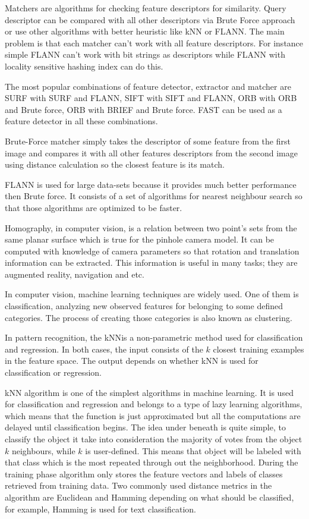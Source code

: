 \documentclass[../../../../main]{subfiles}
\begin{document}
Matchers are algorithms for checking feature descriptors for similarity. Query descriptor can be compared with all other descriptors via Brute Force approach or use other algorithms with better heuristic like \ac{kNN} or \ac{FLANN}. The main problem is that each matcher can't work with all feature descriptors. For instance simple \ac{FLANN} can't work with bit strings as descriptors while \ac{FLANN} with locality sensitive hashing index can do this.

The most popular combinations of feature detector, extractor and matcher are \ac{SURF} with \ac{SURF} and \ac{FLANN}, \ac{SIFT} with \ac{SIFT} and \ac{FLANN}, \ac{ORB} with \ac{ORB} and Brute force, \ac{ORB} with \ac{BRIEF} and Brute force. \ac{FAST} can be used as a feature detector in all these combinations.

Brute-Force matcher simply takes the descriptor of some feature from the first image and compares it with all other features descriptors from the second image using distance calculation so the closest feature is its match.

\ac{FLANN} is used for large data-sets because it provides much better performance then Brute force. It consists of a set of algorithms for nearest neighbour search so that those algorithms are optimized to be faster.

Homography, in computer vision, is a relation between two point's sets from the same planar surface which is true for the pinhole camera model. It can be computed with knowledge of camera parameters so that rotation and translation information can be extracted. This information is useful in many tasks; they are augmented reality, navigation and etc.

In computer vision, machine learning techniques are widely used. One of them is classification, analyzing new observed features for belonging to some defined categories. The process of creating those categories is also known as clustering.

In pattern recognition, the \ac{kNN}is a non-parametric method used for classification and regression. In both cases, the input consists of the $k$ closest training examples in the feature space. The output depends on whether \ac{kNN} is used for classification or regression.

\ac{kNN} algorithm is one of the simplest algorithms in machine learning. It is used for classification and regression and belongs to a type of lazy learning algorithms, which means that the function is just approximated but all the computations are delayed until classification begins. The idea under beneath is quite simple, to classify the object it take into consideration the majority of votes from the object $k$ neighbours, while $k$ is user-defined. This means that object will be labeled with that class which is the most repeated through out the neighborhood.
During the training phase algorithm only stores the feature vectors and labels of classes retrieved from training data. 
Two commonly used distance metrics in the algorithm are Euclidean and Hamming depending on what should be classified, for example, Hamming is used for text classification.
\end{document}
